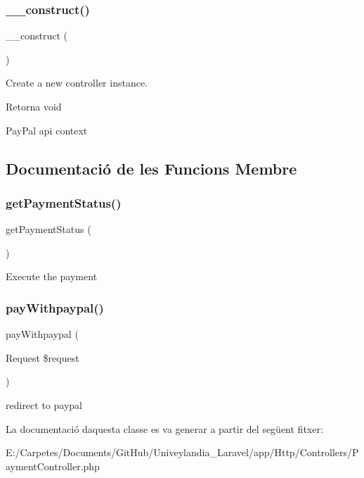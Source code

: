 \subsubsection{\texorpdfstring{\+\_\+\+\_\+construct()}{\_\_construct()}}
{\footnotesize\ttfamily \+\_\+\+\_\+construct (\begin{DoxyParamCaption}{ }\end{DoxyParamCaption})}

Create a new controller instance.

\begin{DoxyReturn}{Retorna}
void 
\end{DoxyReturn}
Pay\+Pal api context 

\subsection{Documentació de les Funcions Membre}
\mbox{\label{class_app_1_1_http_1_1_controllers_1_1_payment_controller_a4fae285c47bd22cd04e7f1007f72148a}} 
\subsubsection{\texorpdfstring{get\+Payment\+Status()}{getPaymentStatus()}}
{\footnotesize\ttfamily get\+Payment\+Status (\begin{DoxyParamCaption}{ }\end{DoxyParamCaption})}

Execute the payment \mbox{\label{class_app_1_1_http_1_1_controllers_1_1_payment_controller_ac5fc82dc1ab26f22f5023f3a34cfe399}} 
\subsubsection{\texorpdfstring{pay\+Withpaypal()}{payWithpaypal()}}
{\footnotesize\ttfamily pay\+Withpaypal (\begin{DoxyParamCaption}\item[{Request}]{\$request }\end{DoxyParamCaption})}

redirect to paypal 

La documentació d\textquotesingle{}aquesta classe es va generar a partir del següent fitxer\+:\begin{DoxyCompactItemize}
\item 
E\+:/\+Carpetes/\+Documents/\+Git\+Hub/\+Univeylandia\+\_\+\+Laravel/app/\+Http/\+Controllers/Payment\+Controller.\+php\end{DoxyCompactItemize}
